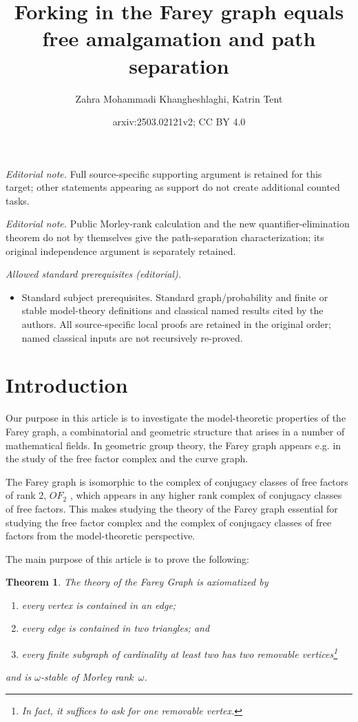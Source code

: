 \documentclass[10pt,a4paper]{amsart}
\title{Forking in the Farey graph equals free amalgamation and path separation}
\author{Zahra Mohammadi Khangheshlaghi, Katrin Tent}
\date{arxiv:2503.02121v2; CC BY 4.0}
\newtheorem{theorem}[defi]{Theorem}
\begin{document}
\maketitle
\noindent\textit{Editorial note.} Full source-specific supporting argument is retained for this target; other statements appearing as support do not create additional counted tasks.\par\medskip
\noindent\textit{Editorial note.} Public Morley-rank calculation and the new quantifier-elimination theorem do not by themselves give the path-separation characterization; its original independence argument is separately retained.\par\medskip
\noindent\textit{Allowed standard prerequisites (editorial).}\begin{itemize}
\item Standard subject prerequisites. Standard graph/probability and finite or stable model-theory definitions and classical named results cited by the authors. All source-specific local proofs are retained in the original order; named classical inputs are not recursively re-proved.
\end{itemize}\medskip
\section{Introduction}



Our purpose in this article is to investigate the model-theoretic properties of the Farey graph, 
a combinatorial and geometric structure that arises in a number of mathematical fields. 
In geometric group theory, the Farey graph appears e.g. in the study of the free factor complex and the curve graph.

The Farey graph is isomorphic to the complex of conjugacy classes of free factors of rank 2, $OF_2$ \cite{Free_factor_complex_rigidity}, which appears 
in any higher rank complex of conjugacy classes of free factors. This makes studying the theory of the Farey graph essential 
for studying the free factor complex and the complex of conjugacy classes of free factors from the model-theoretic perspective.



The main purpose of this article is to prove the following:

\begin{theorem} \label{main_th}
    The theory of the Farey Graph is axiomatized by
\begin{enumerate}
\item every vertex is contained in an edge;
\item every edge is contained in two triangles; and

\item every finite subgraph of cardinality at least two has two removable vertices\footnote{In fact, it suffices to ask for one removable vertex.}
\end{enumerate}
and   is $\omega$-stable of Morley rank~$\omega$.
\end{theorem}
\end{document}
